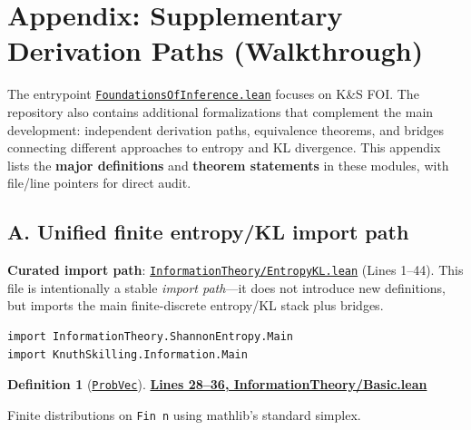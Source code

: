 \documentclass[11pt]{article}
\theoremstyle{definition}
\newtheorem{definition}[theorem]{Definition}
\theoremstyle{remark}
\begin{document}
\section*{Appendix: Supplementary Derivation Paths (Walkthrough)}
\label{app:supplementary}

The entrypoint \href{https://github.com/zariuq/ks-foundations-of-inference/blob/main/KnuthSkilling/FoundationsOfInference.lean}{\texttt{FoundationsOfInference.lean}} focuses on K\&S FOI.
The repository also contains additional formalizations that complement the main development: independent derivation paths, equivalence theorems, and bridges connecting different approaches to entropy and KL divergence. This appendix lists the \textbf{major definitions} and \textbf{theorem statements} in these modules, with file/line pointers for direct audit.

\subsection*{A. Unified finite entropy/KL import path}

\textbf{Curated import path}: \href{https://github.com/zariuq/ks-foundations-of-inference/blob/main/InformationTheory/EntropyKL.lean}{\texttt{InformationTheory/EntropyKL.lean}}
(Lines 1--44).  This file is intentionally a stable \emph{import path}---it does not introduce new
definitions, but imports the main finite-discrete entropy/KL stack plus bridges.

\begin{lstlisting}[caption={Curated entrypoint: entropy + KL from all routes (imports only)}]
import InformationTheory.ShannonEntropy.Main
import KnuthSkilling.Information.Main
\end{lstlisting}

\begin{definition}[\href{https://github.com/zariuq/ks-foundations-of-inference/blob/main/InformationTheory/Basic.lean\#L36}{\texttt{ProbVec}}]
\textbf{\href{https://github.com/zariuq/ks-foundations-of-inference/blob/main/InformationTheory/Basic.lean\#L28-L36}{Lines 28--36, InformationTheory/Basic.lean}}

Finite distributions on \texttt{Fin n} using mathlib's standard simplex.
\end{definition}
\end{document}
